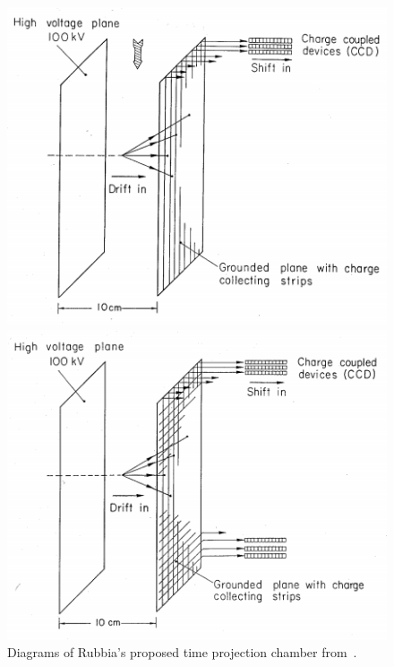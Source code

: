 \begin{figure}[h]
  \begin{minipage}[t]{0.49\textwidth}
    \includegraphics[width=\linewidth]{files/figures/dune_detector/tpcRubbia1}
  \end{minipage}
  \hfill
  \begin{minipage}[t]{0.49\textwidth}
    \includegraphics[width=\linewidth]{files/figures/dune_detector/tpcRubbia}
  \end{minipage}
  \caption[Diagrams of Carlo Rubbia's proposed liquid argon time projection chamber.]{Diagrams of Rubbia's proposed time projection chamber from~\cite{rubbiaProp}.}
  \label{fig:tpcRubbia}
\end{figure}

